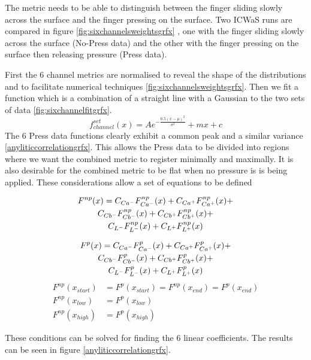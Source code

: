 The metric needs to be able to distinguish between the finger sliding slowly across the surface and the finger pressing on the surface. Two ICWaS runs are compared in figure  \ref{fig:sixchannelsweightsgrfx} , one with the finger sliding slowly across the surface (No-Press data) and the other with the finger pressing on the surface then releasing pressure (Press data). 

First the 6 channel metrics are normalised to reveal the shape of the distributions and to facilitate numerical techniques \ref{fig:sixchannelsweightsgrfx}. Then we fit a function which is a combination of a straight line with a Gaussian to the two sets of data \ref{fig:sixchannelfitgrfx}. 
\begin{equation}
f^{set}_{channel} (x) = A e^{-\frac{0.5 (x-\mu )^2}{\sigma ^2}}+m x +c
\end{equation}
The 6 Press data functions clearly exhibit a common peak  and a similar variance \ref{anyliticcorrelationgrfx}. This allows the Press data to be divided into regions where we want the combined metric to register minimally and maximally. It is also desirable for the combined metric to be flat when no pressure is is being applied. These considerations allow  a set of equations to be defined

\begin{multline}
F^{np}(x) =    C_{Ca^-} F^{np}_{Ca^-}(x) + C_{Ca^+} F^{np}_{Ca^+}(x) +   \\
  C_{Cb^-} F^{np}_{Cb^-}(x) + C_{Cb^+} F^{np}_{Cb^+}(x) +   \\ 
  C_{L^-}    F^{np}_{  L^-}(x) + C_{L^+}   F^{np}_{   L^+}(x)   
\end{multline}

\begin{multline}
F^{p}(x) =  
 C_{Ca^-} F^{p}_{Ca^-}(x) + C_{Ca^+} F^{p}_{Ca^+}(x) +  \\
  C_{Cb^-} F^{p}_{Cb^-}(x) + C_{Cb^+} F^{p}_{Cb^+}(x) + \\ 
   C_{L^-}    F^{p}_{  L^-}(x) + C_{L^+}   F^{p}_{   L^+}(x) 
\end{multline}
\begin{align}
F^{np}(x_{start}) & = F^{p}(x_{start}) = F^{np}(x_{end}) = F^{p}(x_{end}) \\
F^{np}(x_{low}) & = F^{p}(x_{low})  \\
F^{np}(x_{high}) & = F^{p}(x_{high})  
\end{align}

These conditions can be solved for finding the 6 linear coefficients. The results can be seen in figure \ref{anyliticcorrelationgrfx}.

